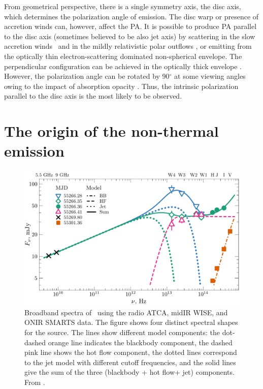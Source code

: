 From geometrical perspective, there is a single symmetry axis, the disc axis, which determines the polarization angle of emission.
The disc warp or presence of accretion winds can, however, affect the \gls{PA}.
It is possible to produce \gls{PA} parallel to the disc axis (sometimes believed to be also jet axis) by scattering in the slow accretion winds \paperIIp\ and in the mildly relativistic polar outflows \citep{Beloborodov1998,Beloborodov1999}, or emitting from the optically thin electron-scattering dominated non-spherical envelope.
The perpendicular configuration can be achieved in the optically thick envelope \citep[e.g.,][]{Sobolev1949,Sobolev1963}.
However, the polarization angle can be rotated by 90$^\circ$ at some viewing angles owing to the impact of absorption opacity \citep[Nagirner effect,][]{Nagirner1962}.
Thus, the intrinsic polarization parallel to the disc axis is the most likely to be observed.



\section{The origin of the non-thermal  emission}
\begin{figure}
    \centering
    \includegraphics[keepaspectratio, width = 1\linewidth]{images/spec_dec_1.pdf}
    \caption{
        Broadband spectra of \GX\ using the radio \gls{ATCA}, \gls{midIR} \gls{WISE}, and \gls{ONIR} \gls{SMARTS} data.
        The figure shows four distinct spectral shapes for the source.
        The lines show different model components: the dot-dashed orange line indicates the blackbody component, the dashed pink line shows the hot flow component, the dotted lines correspond to the jet model with different cutoff frequencies, and the solid lines give the sum of the three (blackbody + hot flow+ jet) components.
        From \paperV.
    }
    \label{fig:gx_spec_dec}
\end{figure}

